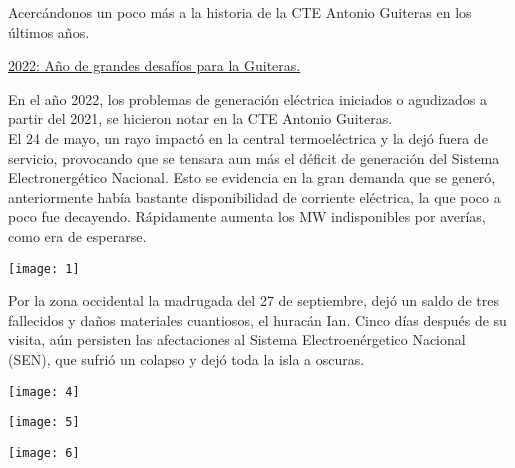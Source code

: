 \documentclass{article}
\begin{document}
\vspace{0.5cm}

Acercándonos un poco más a la historia de la CTE Antonio Guiteras en los últimos años.\\
\begin{center}
    \underline{2022: Año de grandes desafíos para la Guiteras.}
\end{center}

En el año 2022, los problemas de generación eléctrica iniciados o agudizados a partir del 2021, se hicieron notar en la CTE Antonio Guiteras.\\
El 24 de mayo, un rayo impactó en la central termoeléctrica y la dejó fuera de servicio, provocando que se tensara aun más el déficit de generación del Sistema Electronergético Nacional. Esto se evidencia en la gran demanda que se generó, anteriormente había bastante disponibilidad de corriente eléctrica, la que poco a poco fue decayendo. Rápidamente aumenta los MW indisponibles por averías, como era de esperarse.\\
\vspace{1cm}
\begin{center}
   \texttt{[image: 1]} \\
\end{center}


\vspace{1cm}

Por la zona occidental la madrugada del 27 de septiembre, dejó un saldo de tres fallecidos y daños materiales cuantiosos, el huracán Ian. Cinco días después de su visita, aún persisten las afectaciones al Sistema Electroenérgetico Nacional (SEN), que sufrió un colapso y dejó toda la isla a oscuras.\\

\vspace{0.5cm}
\begin{center}
   \texttt{[image: 4]} \\
\end{center}


\vspace{0.5cm}
\begin{center}
    \texttt{[image: 5]}\\
\end{center}


\vspace{0.5cm}
\begin{center}
    \texttt{[image: 6]}\\
\end{center}
\end{document}
